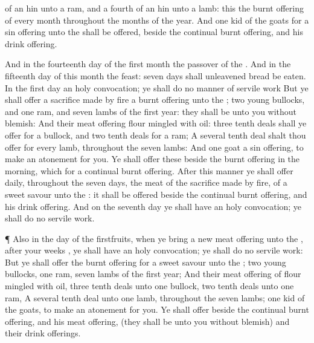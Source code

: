 {{} of an
hin unto a
ram, and a
fourth
{} of an
hin unto a
lamb: this
{} the burnt
offering of every
month throughout the
months of the
year.
And
one
kid of the
goats for a sin
offering unto the
{} shall be
offered, beside the
continual burnt
offering, and his drink
offering.
\par }{\PP {}And in the
fourteenth
day of the
first
month
{} the
passover of the
{}.
And in the
fifteenth
day of this
month
{} the
feast:
seven
days shall unleavened
bread be
eaten.
In the
first
day
{} an
holy
convocation; ye shall
do no manner of
servile
work
{}
But ye shall
offer a sacrifice made by
fire
{} a burnt
offering unto the
{};
two
young
bullocks, and
one
ram, and
seven
lambs of the
first
year: they shall be unto you without
blemish:
And their meat
offering
{}
flour
mingled with
oil:
three tenth
deals shall ye
offer for a
bullock, and
two tenth
deals for a
ram;
A several tenth
deal shalt thou
offer for
every
lamb, throughout the
seven
lambs:
And
one
goat
{} a sin
offering, to make an
atonement for you.
Ye shall
offer these beside the burnt
offering in the
morning, which
{} for a
continual burnt
offering.
After this manner ye shall
offer
daily, throughout the
seven
days, the
meat of the sacrifice made by
fire, of a
sweet
savour unto the
{}: it shall be
offered beside the
continual burnt
offering, and his drink
offering.
And on the
seventh
day ye shall have an
holy
convocation; ye shall
do no
servile
work.
\par }{\PP {}¶ Also in the
day of the
firstfruits, when ye
bring a
new meat
offering unto the
{}, after your
weeks
{}, ye shall have an
holy
convocation; ye shall
do no
servile
work:
But ye shall
offer the burnt
offering for a
sweet
savour unto the
{};
two
young
bullocks,
one
ram,
seven
lambs of the
first
year;
And their meat
offering of
flour
mingled with
oil,
three tenth
deals unto
one
bullock,
two tenth
deals unto
one
ram,
A several tenth
deal unto
one
lamb, throughout the
seven
lambs;
one
kid of the
goats, to make an
atonement for you.
Ye shall
offer
{} beside the
continual burnt
offering, and his meat
offering, (they shall be unto you without
blemish) and their drink
offerings.

}
